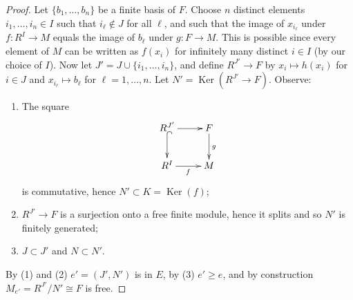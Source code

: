 \documentclass{amsart}
\theoremstyle{plain}
\theoremstyle{definition}
\theoremstyle{remark}
\numberwithin{equation}{subsection}
\def\Ker{\mathop{\mathrm{Ker}}}
\begin{document}
\begin{proof}
\medskip\noindent
Let $\{ b_1, \ldots, b_n \}$ be a finite basis of $F$.  Choose $n$ distinct
elements $i_1, \ldots, i_n \in I$ such that $i_{\ell} \notin J$ for all $\ell$,
and such that the image of $x_{i_{\ell}}$ under $f: R^I \to M$ equals
the image of $b_{\ell}$ under $g: F \to M$.  This is possible since
every element of $M$ can be written as $f(x_i)$ for infinitely many
distinct $i \in I$ (by our choice of $I$).  Now let
$J' = J \cup \{i_1, \ldots , i_n \}$, and define $R^{J'}
\to F$ by $x_i \mapsto h(x_i)$ for $i \in J$ and $x_{i_{\ell}} \mapsto
b_{\ell}$ for $\ell = 1, \ldots, n$.  Let $N' = \Ker(R^{J'} \to F)$.
Observe:
\begin{enumerate}
\item The square
$$
\xymatrix{
R^{J'} \ar[r] \ar@{^{(}->}[d] & F \ar[d]^{g} \\
R^{I} \ar[r]_{f} & M
}
$$
is commutative,
hence $N' \subset K = \Ker(f)$;
\item $R^{J'} \to F$ is a surjection onto a free finite module, hence
it splits and so $N'$ is finitely generated;
\item $J \subset J'$ and $N \subset N'$.
\end{enumerate}
By (1) and (2) $e' = (J', N')$ is in $E$, by (3) $e' \geq e$, and by
construction $M_{e'} = R^{J'}/N' \cong F$ is free.
\end{proof}
\end{document}
